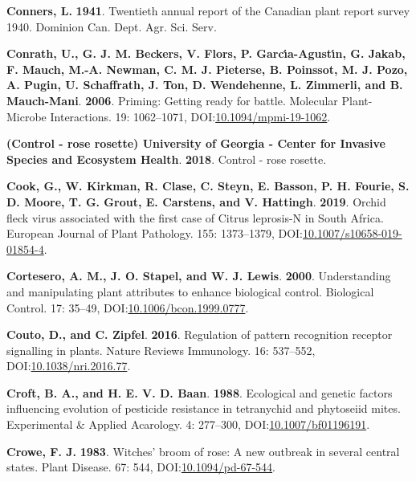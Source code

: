 \documentclass[12pt,final,CPage]{ufthesis}
\newlength{\cslhangindent}
\newenvironment{CSLReferences}[2] %
{%
	\setlength{\parindent}{0pt}
	\ifodd #1 \everypar{\setlength{\hangindent}{\cslhangindent}}\ignorespaces\fi
	\ifnum #2 > 0
	\setlength{\parskip}{#2\baselineskip}
	\fi
}%
{}
\begin{document}
{\begin{CSLReferences}{1}{0}
  \leavevmode{}%
  \textbf{Conners, L.} \textbf{1941}. Twentieth annual report of the {Canadian} plant report survey 1940. Dominion Can. Dept. Agr. Sci. Serv.

  \leavevmode{}%
  \textbf{Conrath, U., G. J. M. Beckers, V. Flors, P. Garcı́a-Agustı́n, G. Jakab, F. Mauch, M.-A. Newman, C. M. J. Pieterse, B. Poinssot, M. J. Pozo, A. Pugin, U. Schaffrath, J. Ton, D. Wendehenne, L. Zimmerli, and B. Mauch-Mani}. \textbf{2006}. Priming: Getting ready for battle. Molecular Plant-Microbe Interactions{\textregistered}. 19: 1062--1071, DOI:\href{https://doi.org/10.1094/mpmi-19-1062}{10.1094/mpmi-19-1062}.

  \leavevmode{}%
  \textbf{(Control - rose rosette) University of Georgia - Center for Invasive Species and Ecosystem Health}. \textbf{2018}. Control - rose rosette.

  \leavevmode{}%
  \textbf{Cook, G., W. Kirkman, R. Clase, C. Steyn, E. Basson, P. H. Fourie, S. D. Moore, T. G. Grout, E. Carstens, and V. Hattingh}. \textbf{2019}. {Orchid fleck virus} associated with the first case of {Citrus leprosis}-{N} in {South Africa}. European Journal of Plant Pathology. 155: 1373--1379, DOI:\href{https://doi.org/10.1007/s10658-019-01854-4}{10.1007/s10658-019-01854-4}.

  \leavevmode{}%
  \textbf{Cortesero, A. M., J. O. Stapel, and W. J. Lewis}. \textbf{2000}. Understanding and manipulating plant attributes to enhance biological control. Biological Control. 17: 35--49, DOI:\href{https://doi.org/10.1006/bcon.1999.0777}{10.1006/bcon.1999.0777}.

  \leavevmode{}%
  \textbf{Couto, D., and C. Zipfel}. \textbf{2016}. Regulation of pattern recognition receptor signalling in plants. Nature Reviews Immunology. 16: 537--552, DOI:\href{https://doi.org/10.1038/nri.2016.77}{10.1038/nri.2016.77}.

  \leavevmode{}%
  \textbf{Croft, B. A., and H. E. V. D. Baan}. \textbf{1988}. Ecological and genetic factors influencing evolution of pesticide resistance in tetranychid and phytoseiid mites. Experimental {\&} Applied Acarology. 4: 277--300, DOI:\href{https://doi.org/10.1007/bf01196191}{10.1007/bf01196191}.

  \leavevmode{}%
  \textbf{Crowe, F. J.} \textbf{1983}. Witches' broom of rose: A new outbreak in several central states. Plant Disease. 67: 544, DOI:\href{https://doi.org/10.1094/pd-67-544}{10.1094/pd-67-544}.


\end{CSLReferences}}
\end{document}
